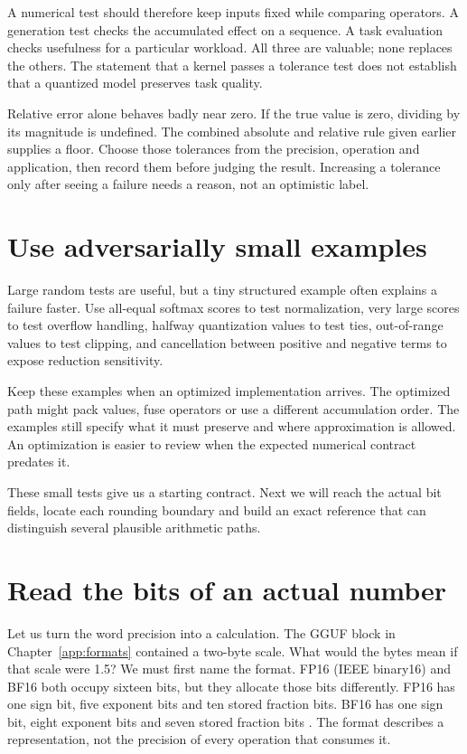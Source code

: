 A numerical test should therefore keep inputs fixed while comparing
operators. A generation test checks the accumulated effect on a
sequence. A task evaluation checks usefulness for a particular
workload. All three are valuable; none replaces the others.
The statement that a kernel passes a tolerance test does not establish
that a quantized model preserves task quality.

Relative error alone behaves badly near zero. If the true value is
zero, dividing by its magnitude is undefined. The combined absolute
and relative rule given earlier supplies a floor. Choose those
tolerances from the precision, operation and application, then record
them before judging the result. Increasing a tolerance only after
seeing a failure needs a reason, not an optimistic label.

\section{Use adversarially small examples}
Large random tests are useful, but a tiny structured example often
explains a failure faster. Use all-equal softmax scores to test
normalization, very large scores to test overflow handling, halfway
quantization values to test ties, out-of-range values to test clipping,
and cancellation between positive and negative terms to expose
reduction sensitivity.

Keep these examples when an optimized implementation arrives.
The optimized path might pack values, fuse operators or use a different
accumulation order. The examples still specify what it must preserve
and where approximation is allowed. An optimization is easier to
review when the expected numerical contract predates it.

These small tests give us a starting contract. Next we will reach the
actual bit fields, locate each rounding boundary and build an exact
reference that can distinguish several plausible arithmetic paths.
\section{Read the bits of an actual number}
Let us turn the word precision into a calculation. The GGUF block in
Chapter~\ref{app:formats} contained a two-byte scale. What would the
bytes mean if that scale were 1.5? We must first name the format. FP16
(IEEE binary16) and BF16 both occupy sixteen bits, but they allocate
those bits differently. FP16 has one sign bit, five exponent bits and
ten stored fraction bits. BF16 has one sign bit, eight exponent bits
and seven stored fraction bits \cite{python2026struct,khronos2026bf16}.
The format describes a representation, not the precision of every
operation that consumes it.

